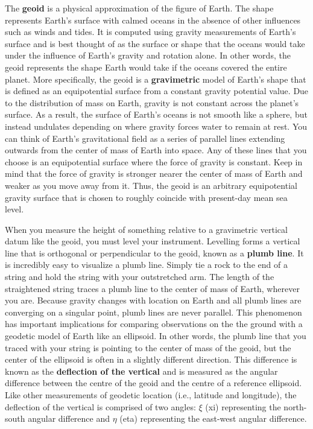 \documentclass[
]{book}
\begin{document}
The \textbf{geoid} is a physical approximation of the figure of Earth. The shape represents Earth's surface with calmed oceans in the absence of other influences such as winds and tides. It is computed using gravity measurements of Earth's surface and is best thought of as the surface or shape that the oceans would take under the influence of Earth's gravity and rotation alone. In other words, the geoid represents the shape Earth would take if the oceans covered the entire planet. More specifically, the geoid is a \textbf{gravimetric} model of Earth's shape that is defined as an equipotential surface from a constant gravity potential value. Due to the distribution of mass on Earth, gravity is not constant across the planet's surface. As a result, the surface of Earth's oceans is not smooth like a sphere, but instead undulates depending on where gravity forces water to remain at rest. You can think of Earth's gravitational field as a series of parallel lines extending outwards from the center of mass of Earth into space. Any of these lines that you choose is an equipotential surface where the force of gravity is constant. Keep in mind that the force of gravity is stronger nearer the center of mass of Earth and weaker as you move away from it. Thus, the geoid is an arbitrary equipotential gravity surface that is chosen to roughly coincide with present-day mean sea level.

When you measure the height of something relative to a gravimetric vertical datum like the geoid, you must level your instrument. Levelling forms a vertical line that is orthogonal or perpendicular to the geoid, known as a \textbf{plumb line}. It is incredibly easy to visualize a plumb line. Simply tie a rock to the end of a string and hold the string with your outstretched arm. The length of the straightened string traces a plumb line to the center of mass of Earth, wherever you are. Because gravity changes with location on Earth and all plumb lines are converging on a singular point, plumb lines are never parallel. This phenomenon has important implications for comparing observations on the the ground with a geodetic model of Earth like an ellipsoid. In other words, the plumb line that you traced with your string is pointing to the center of mass of the geoid, but the center of the ellipsoid is often in a slightly different direction. This difference is known as the \textbf{deflection of the vertical} and is measured as the angular difference between the centre of the geoid and the centre of a reference ellipsoid. Like other measurements of geodetic location (i.e., latitude and longitude), the deflection of the vertical is comprised of two angles: \(ξ\) (xi) representing the north-south angular difference and \(η\) (eta) representing the east-west angular difference.
\end{document}
